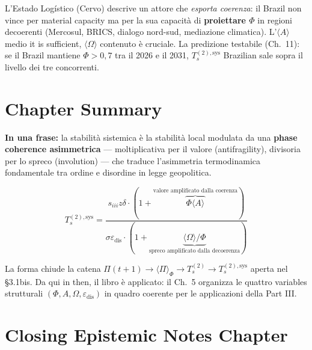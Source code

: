L'Estado Logístico (Cervo) descrive un attore che \emph{esporta
coerenza}: il Brazil non vince per material capacity ma per la sua
capacità di \textbf{proiettare \(\Phi\)} in regioni decoerenti
(Mercosul, BRICS, dialogo nord-sud, mediazione climatica).
L'\(\langle A\rangle\) medio it is sufficient, \(\langle\Omega\rangle\)
contenuto è cruciale. La predizione testabile (Ch.~11): se il Brazil
mantiene \(\Phi > 0{,}7\) tra il 2026 e il 2031,
\(T_s^{(2),\text{sys}}\) Brazilian sale sopra il livello dei tre
concorrenti.



\section{Chapter Summary}\label{sintesi-del-chapter}

\Proved{} \textbf{In una frase:} la stabilità sistemica è la stabilità
local modulata da una \textbf{phase coherence asimmetrica} ---
moltiplicativa per il valore (antifragility), divisoria per lo spreco
(involution) --- che traduce l'asimmetria termodinamica fondamentale
tra ordine e disordine in legge geopolitica.

\[
T_s^{(2),\text{sys}} = \frac{s_{iii} z \delta \cdot (1 + \overbrace{\Phi\langle A\rangle}^{\text{valore amplificato dalla coerenza}})}{\sigma \varepsilon_{\text{dis}} \cdot (1 + \underbrace{\langle\Omega\rangle/\Phi}_{\text{spreco amplificato dalla decoerenza}})}
\]

La forma chiude la catena
\(\Pi(t+1) \to \langle\Pi\rangle_\Phi \to T_s^{(2)} \to T_s^{(2),\text{sys}}\)
aperta nel \S{}3.1bis. Da qui in then, il libro è applicato: il Ch.~5
organizza le quattro variables strutturali
\((\Phi, A, \Omega, \varepsilon_{\text{dis}})\) in quadro coerente per
le applicazioni della Part III.



\section{Closing Epistemic Notes
Chapter}\label{note-epistemiche-di-chiusura-chapter}

